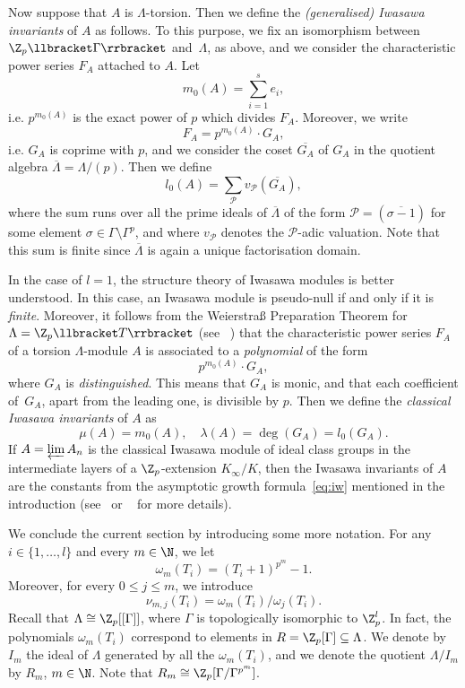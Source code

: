 Now suppose that $A$ is $\Lambda$-torsion. Then we define the \emph{(generalised) Iwasawa invariants} of $A$ as follows. To this purpose, we fix an isomorphism between $\Z_p\llbracket \Gamma\rrbracket $ and~$\Lambda$, as above, and we consider the characteristic power series $F_A$ attached to $A$. Let 
\[ m_0(A) = \sum_{i = 1}^s e_i, \] 
i.e. $p^{m_0(A)}$ is the exact power of $p$ which divides $F_A$. Moreover, we write 
\[ F_A = p^{m_0(A)} \cdot G_A, \] 
i.e. $G_A$ is coprime with $p$, and we consider the coset $\overline{G_A}$ of $G_A$ in the quotient algebra $\overline{\Lambda} = \Lambda/(p)$. Then we define 
\[ l_0(A) = \sum_{\mathcal{P}} v_{\mathcal{P}}(\overline{G_A}), \] 
where the sum runs over all the prime ideals of $\overline{\Lambda}$ of the form ${\mathcal{P} = (\overline{\sigma - 1})}$ for some element ${\sigma \in \Gamma \setminus \Gamma^p}$, and where $v_{\mathcal{P}}$ denotes the $\mathcal{P}$-adic valuation. Note that this sum is finite since $\overline{\Lambda}$ is again a unique factorisation domain. 

In the case of ${l = 1}$, the structure theory of Iwasawa modules is better understood. In this case, an Iwasawa module is pseudo-null if and only if it is \emph{finite}. Moreover, it follows from the Weierstra{\ss} Preparation Theorem for ${\Lambda = \Z_p\llbracket T\rrbracket }$ (see ~\cite[Theorem~7.3]{wash}) that the characteristic power series $F_A$ of a torsion $\Lambda$-module $A$ is associated to a \emph{polynomial} of the form 
\[ p^{m_0(A)} \cdot G_A, \] 
where $G_A$ is \emph{distinguished}. This means that $G_A$ is monic, and that each coefficient of~$G_A$, apart from the leading one, is divisible by $p$. Then we define the \emph{classical Iwasawa invariants} of $A$ as 
\[ \mu(A) = m_0(A), \quad \lambda(A) = \deg(G_A)=l_0(G_A). \] 
If $A = \varprojlim A_n$ is the classical Iwasawa module of ideal class groups in the intermediate layers of a $\Z_p$-extension $K_\infty/K$, then the Iwasawa invariants of $A$ are the constants from the asymptotic growth formula~\eqref{eq:iw} mentioned in the introduction (see~\cite{iwasawa} or ~\cite[Chapter~13]{wash} for more details). 

We conclude the current section by introducing some more notation. For any ${i \in \{1, \ldots, l\}}$ and every ${m \in \N}$, we let 
\[ \omega_m(T_i) = (T_i + 1)^{p^m} - 1. \] 
Moreover, for every $0 \le j \le m$, we introduce 
\[ \nu_{m,j}(T_i) =\omega_m(T_i)/\omega_j(T_i). \] 
Recall that $\Lambda \cong \Z_p[[\Gamma]]$, where $\Gamma$ is topologically isomorphic to $\Z_p^l$. In fact, the polynomials $\omega_m(T_i)$ correspond to elements in ${R = \Z_p[\Gamma] \subseteq \Lambda}$. We denote by $I_m$ the ideal of ${\Lambda}$ generated by all the $\omega_m(T_i)$, and we denote the quotient ${\Lambda/I_m}$ by $R_m$, ${m \in \N}$. Note that ${R_m \cong \Z_p[\Gamma/\Gamma^{p^m}]}$. 

